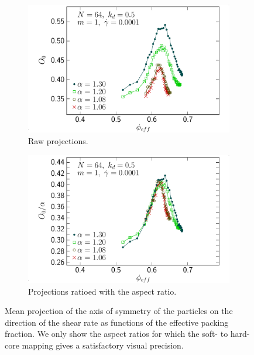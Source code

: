 \documentclass[class=report, float=false, crop=false]{standalone}
\begin{document}
\begin{figure}[h!]
\centering
    \begin{subfigure}[t]{0.49\textwidth}
        \centering
        \includegraphics[width=\textwidth]{figures/figs/ori0_phieff_0064_KDk500_Ml100_GDh100}
        \caption{Raw projections.}
        \label{ori0_phieff_prolate_0064_KDk500_Ml100_GDh100}
    \end{subfigure}
    \hfill
    \begin{subfigure}[t]{0.49\textwidth}
        \centering
        \includegraphics[width=\textwidth]{figures/figs/ori0al_phieff_0064_KDk500_Ml100_GDh100}
        \caption{Projections ratioed with the aspect ratio.}
        \label{ori0al_phieff_prolate_0064_KDk500_Ml100_GDh100}
    \end{subfigure}
    \caption{Mean projection of the axis of symmetry of the particles on the direction of the shear rate as functions of the effective packing fraction. We only show the aspect ratios for which the soft- to hard-core mapping gives a satisfactory visual precision.}
    \label{ori_phieff_0064}
\end{figure}
\end{document}
